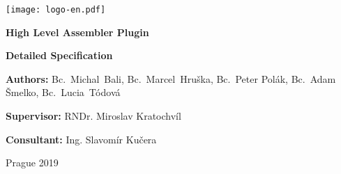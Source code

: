 \pagestyle{empty}
\hypersetup{pageanchor=false}
\begin{center}

\centerline{\mbox{\texttt{[image: logo-en.pdf]}}}

\vspace{-8mm}
\vfill


{\LARGE\bfseries {High Level Assembler Plugin}}


\vfill

{\bf\Large Detailed Specification}

\vfill

{\large{\bfseries Authors:} Bc.~Michal~Bali, Bc.~Marcel~Hruška, Bc.~Peter Polák, Bc.~Adam Šmelko, Bc.~Lucia~Tódová}

\vspace{15px}

{\large{\bfseries Supervisor:} RNDr. Miroslav Kratochvíl}
\
\vspace{15px}

{\large{\bfseries Consultant:} Ing. Slavomír Kučera}




\vfill


\vfill

Prague 2019

\end{center}

\newpage


\pagestyle{plain}
\setcounter{page}{1}
